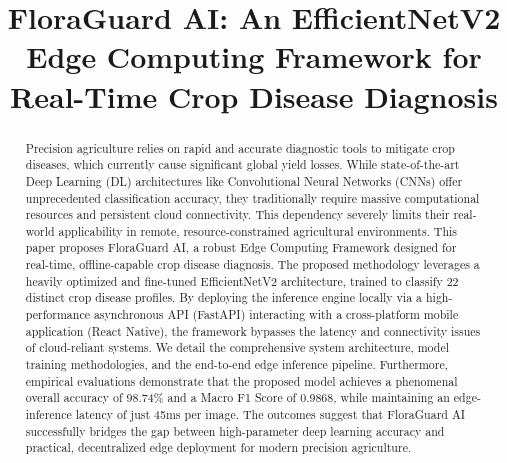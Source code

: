 \documentclass[conference]{IEEEtran}
\begin{document}
\title{FloraGuard AI: An EfficientNetV2 Edge Computing Framework for Real-Time Crop Disease Diagnosis}

\author{
\and
{}
\and
{}
}

\maketitle

\begin{abstract}
Precision agriculture relies on rapid and accurate diagnostic tools to mitigate crop diseases, which currently cause significant global yield losses. While state-of-the-art Deep Learning (DL) architectures like Convolutional Neural Networks (CNNs) offer unprecedented classification accuracy, they traditionally require massive computational resources and persistent cloud connectivity. This dependency severely limits their real-world applicability in remote, resource-constrained agricultural environments. This paper proposes FloraGuard AI, a robust Edge Computing Framework designed for real-time, offline-capable crop disease diagnosis. The proposed methodology leverages a heavily optimized and fine-tuned EfficientNetV2 architecture, trained to classify 22 distinct crop disease profiles. By deploying the inference engine locally via a high-performance asynchronous API (FastAPI) interacting with a cross-platform mobile application (React Native), the framework bypasses the latency and connectivity issues of cloud-reliant systems. We detail the comprehensive system architecture, model training methodologies, and the end-to-end edge inference pipeline. Furthermore, empirical evaluations demonstrate that the proposed model achieves a phenomenal overall accuracy of 98.74\% and a Macro F1 Score of 0.9868, while maintaining an edge-inference latency of just 45ms per image. The outcomes suggest that FloraGuard AI successfully bridges the gap between high-parameter deep learning accuracy and practical, decentralized edge deployment for modern precision agriculture.
\end{abstract}
\end{document}
